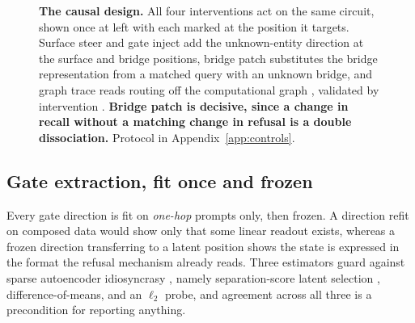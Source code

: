 \documentclass{article}
\begin{document}
\begin{figure}[t]
\vspace{-0.3em}
\caption{\textbf{The causal design.} All four interventions act on the same circuit, shown once at
left with each marked at the position it targets. Surface steer and gate inject add the
unknown-entity direction at the surface and bridge positions, bridge patch substitutes the bridge
representation from a matched query with an unknown bridge, and graph trace reads routing off the
computational graph \citep{ameisen2025circuittracing,hanna2025circuittracer}, validated by
intervention \citep{lindsey2025biology}. \textbf{Bridge patch is decisive, since a change in recall
without a matching change in refusal is a double dissociation.} Protocol in Appendix~\ref{app:controls}.}
\label{fig:causal}
\end{figure}

\subsection{Gate extraction, fit once and frozen}

Every gate direction is fit on \emph{one-hop} prompts only, then frozen. A direction refit on composed
data would show only that some linear readout exists, whereas a frozen direction transferring to a
latent position shows the state is expressed in the format the refusal mechanism already reads. Three
estimators guard against sparse autoencoder idiosyncrasy \citep{kissane2024saedataset}, namely
separation-score latent selection \citep{lieberum2024gemmascope,he2024llamascope}, difference-of-means,
and an $\ell_2$ probe, and agreement across all three is a precondition for reporting anything.
\end{document}
